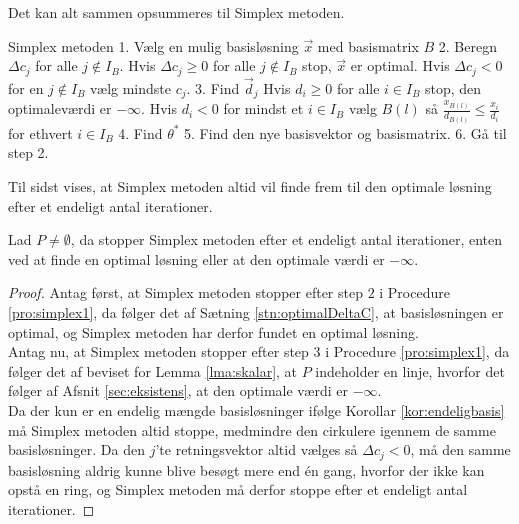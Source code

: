 Det kan alt sammen opsummeres til Simplex metoden.

\begin{pro}[label=pro:simplex1,style=ingental]{Simplex metoden}
1. Vælg en mulig basisløsning $\vec{x}$ med basismatrix $B$
2. Beregn $\Delta c_j$ for alle $j \notin I_B$. 
   Hvis $\Delta c_j\geq 0$ for alle $j \notin I_B$ 
   	   stop, $\vec{x}$ er optimal.
   Hvis $\Delta c_j < 0$ for en $j \notin I_B$
       vælg mindste $c_j$.
3. Find $\vec{d}_j$
   Hvis $d_i \geq 0 $ for alle $i \in I_B$ 
       stop, den optimaleværdi er $- \infty$.
   Hvis $d_i < 0 $ for mindst et $i \in I_B$ 
       vælg $B(l)$ så $\frac{x_{B(l)}}{d_{B(l)}}\leq \frac{x_i}{d_i} $ for ethvert $i \in I_B$
4. Find $\theta^*$
5. Find den nye basisvektor og basismatrix.
6. Gå til step 2.
\end{pro}

Til sidst vises, at Simplex metoden altid vil finde frem til den optimale løsning efter et endeligt antal iterationer.

\begin{stn}
Lad $P \neq \emptyset$, da stopper Simplex metoden efter et endeligt antal iterationer, enten ved at finde en optimal løsning eller at den optimale værdi er $- \infty$.
\end{stn}

\begin{proof}
Antag først, at Simplex metoden stopper efter step $2$ i Procedure \ref{pro:simplex1}, da følger det af Sætning \ref{stn:optimalDeltaC},
at basisløsningen er optimal, og Simplex metoden har derfor fundet en optimal løsning.\\ 
Antag nu, at Simplex metoden stopper efter step $3$ i Procedure \ref{pro:simplex1}, da følger det af beviset for Lemma \ref{lma:skalar}, at $P$ indeholder en linje, hvorfor det følger af Afsnit \ref{sec:eksistens},
at den optimale værdi er $-\infty$.\\ 
Da der kun er en endelig mængde basisløsninger ifølge Korollar \ref{kor:endeligbasis} må Simplex metoden altid stoppe, medmindre den cirkulere igennem de samme basisløsninger.
Da den $j$'te retningsvektor altid vælges så $\Delta c_j < 0$, må den samme basisløsning aldrig kunne blive besøgt mere end én gang, hvorfor der ikke kan opstå en ring, og Simplex metoden må derfor stoppe efter et endeligt antal iterationer.
\end{proof} 